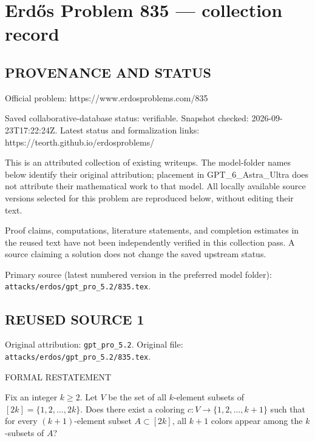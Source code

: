 \section*{Erd\H{o}s Problem 835 --- collection record}

\subsection*{PROVENANCE AND STATUS}
Official problem: https://www.erdosproblems.com/835

Saved collaborative-database status: verifiable.
Snapshot checked: 2026-09-23T17:22:24Z.
Latest status and formalization links: https://teorth.github.io/erdosproblems/

This is an attributed collection of existing writeups. The model-folder names below identify their original attribution; placement in GPT\_6\_Astra\_Ultra does not attribute their mathematical work to that model. All locally available source versions selected for this problem are reproduced below, without editing their text.

Proof claims, computations, literature statements, and completion estimates in the reused text have not been independently verified in this collection pass. A source claiming a solution does not change the saved upstream status.

Primary source (latest numbered version in the preferred model folder): \texttt{attacks/erdos/gpt\_pro\_5.2/835.tex}.

\subsection*{REUSED SOURCE 1}
Original attribution: \texttt{gpt\_pro\_5.2}.
Original file: \texttt{attacks/erdos/gpt\_pro\_5.2/835.tex}.


FORMAL RESTATEMENT

Fix an integer $k\ge 2$.
Let $V$ be the set of all $k$-element subsets of $[2k]=\{1,2,\dots,2k\}$.
Does there exist a coloring $c:V\to\{1,2,\dots,k+1\}$ such that for every $(k+1)$-element subset $A\subset[2k]$, all $k+1$ colors appear among the $k$-subsets of $A$?

